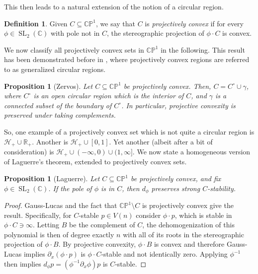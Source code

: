 \documentclass{article}
\newtheorem{proposition}[theorem]{Proposition}
\theoremstyle{definition}
\newtheorem{definition}[theorem]{Definition}
\theoremstyle{plain}
\newcommand{\C}{\mathbb{C}}
\newcommand{\R}{\mathbb{R}}
\newcommand{\CP}{\mathbb{CP}}
\newcommand{\UHP}{\mathcal{H}_+}
\DeclareMathOperator{\SL}{SL}
\begin{document}
This then leads to a natural extension of the notion of a circular region.

\begin{definition}
    Given $C \subseteq \CP^1$, we say that $C$ is \emph{projectively convex} if for every $\phi \in \SL_2(\C)$ with pole not in $C$, the stereographic projection of $\phi \cdot C$ is convex.
\end{definition}

We now classify all projectively convex sets in $\CP^1$ in the following. This result has been demonstrated before in \cite{zervos1960aspects}, where projectively convex regions are referred to as generalized circular regions.

\begin{proposition}[Zervos] \label{proj_conv_characterization}
    Let $C \subseteq \CP^1$ be projectively convex. Then, $C = C^\circ \cup \gamma$, where $C^\circ$ is an open circular region which is the interior of $C$, and $\gamma$ is a connected subset of the boundary of $C^\circ$. In particular, projective convexity is preserved under taking complements.
\end{proposition}

So, one example of a projectively convex set which is not quite a circular region is $\UHP \cup \R_+$. Another is $\UHP \cup [0,1]$. Yet another (albeit after a bit of consideration) is $\UHP \cup (-\infty,0) \cup (1,\infty]$. We now state a homogeneous version of Laguerre's theorem, extended to projectively convex sets.

\begin{proposition}[Laguerre]\label{laguerre_prop}
    Let $C \subseteq \CP^1$ be projectively convex, and fix $\phi \in \SL_2(\C)$. If the pole of $\phi$ is in $C$, then $d_\phi$ preserves strong $C$-stability.
\end{proposition}
\begin{proof}
    Gauss-Lucas and the fact that $\CP^1 \setminus C$ is projectively convex give the result. Specifically, for $C$-stable $p \in V(n)$ consider $\phi \cdot p$, which is stable in $\phi \cdot C \ni \infty$. Letting $B$ be the complement of $C$, the dehomogenization of this polynomial is then of degree exactly $n$ with all of its roots in the stereographic projection of $\phi \cdot B$. By projective convexity, $\phi \cdot B$ is convex and therefore Gauss-Lucas implies $\partial_x(\phi \cdot p)$ is $\phi \cdot C$-stable and not identically zero. Applying $\phi^{-1}$ then implies $d_\phi p = (\phi^{-1} \partial_x \phi) p$ is $C$-stable.
\end{proof}
\end{document}
